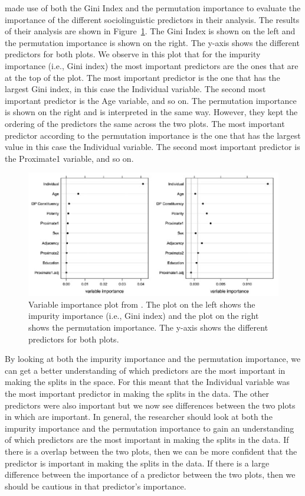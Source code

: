 \citet{tagliamonteModelsForestsTrees2012} made use of both the Gini Index and the permutation importance to evaluate the importance of the different sociolinguistic predictors in their analysis. The results of their analysis are shown in Figure~\ref{fig:tagliamonte_importance}. The Gini Index is shown on the left and the permutation importance is shown on the right. The y-axis shows the different predictors for both plots. We observe in this plot that for the impurity importance (i.e., Gini index) the most important predictors are the ones that are at the top of the plot. The most important predictor is the one that has the largest Gini index, in this case the Individual variable. The second most important predictor is the Age variable, and so on. The permutation importance is shown on the right and is interpreted in the same way. However, they kept the ordering of the predictors the same across the two plots. The most important predictor according to the permutation importance is the one that has the largest value in this case the Individual variable. The second most important predictor is the Proximate1 variable, and so on.

\begin{figure}[h!]
    \centering
    \includegraphics[width = 0.9\linewidth]{images/TagliamonteBaayen_vip.png}
    \caption{Variable importance plot from \citet{tagliamonteModelsForestsTrees2012}. The plot on the left shows the impurity importance (i.e., Gini index) and the plot on the right shows the permutation importance. The y-axis shows the different predictors for both plots.}
    \label{fig:tagliamonte_importance}
\end{figure}

By looking at both the impurity importance and the permutation importance, we can get a better understanding of which predictors are the most important in making the splits in the space. For \citet{tagliamonteModelsForestsTrees2012} this meant that the Individual variable was the most important predictor in making the splits in the data. The other predictors were also important but we now see differences between the two plots in which are important. In general, the researcher should look at both the impurity importance and the permutation importance to gain an understanding of which predictors are the most important in making the splits in the data. If there is a overlap between the two plots, then we can be more confident that the predictor is important in making the splits in the data. If there is a large difference between the importance of a predictor between the two plots, then we should be cautious in that predictor's importance. 

